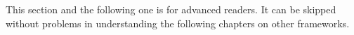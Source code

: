 \largerpage[2]
This section and the following one is for advanced readers. It can be skipped without problems in
understanding the following chapters on other frameworks.



